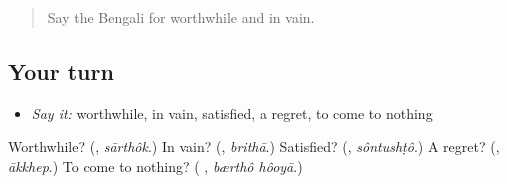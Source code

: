 \begin{quote}
Say the Bengali for worthwhile and in vain.
\end{quote}

\subsection*{Your turn}
\begin{itemize}
\raggedright
  \item \emph{Say it:} worthwhile, in vain, satisfied, a regret, to come to nothing
\end{itemize}

\begin{tcolorbox}[breakable,colback=teal!4,colframe=teal!35!black,title={Before you move on}]
Worthwhile? (\textbf{}, \emph{sārthôk}.) In vain? (\textbf{}, \emph{brithā}.) Satisfied? (\textbf{}, \emph{sôntushṭô}.) A regret? (\textbf{}, \emph{ākkhep}.) To come to nothing? (\textbf{ }, \emph{bærthô hôoyā}.)
\end{tcolorbox}
